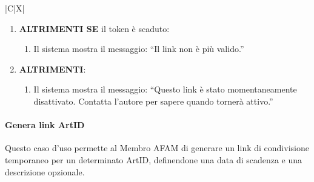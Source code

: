 \begin{tabularx}{\textwidth}{|C|X|}
{\begin{enumerate}
\begin{enumerate}
        \begin{enumerate}
            \item Il sistema mostra il messaggio: ``L'ArtID desiderato non esiste pi\`u.''
        \end{enumerate}
    \end{enumerate}
    \item \textbf{ALTRIMENTI SE} il token \`e scaduto:
        \begin{enumerate}
            \item Il sistema mostra il messaggio: ``Il link non \`e pi\`u valido.''
        \end{enumerate}
    \item \textbf{ALTRIMENTI}:
        \begin{enumerate}
            \item Il sistema mostra il messaggio: ``Questo link \`e stato momentaneamente disattivato. Contatta l'autore per sapere quando torner\`a attivo.''
        \end{enumerate}
\end{enumerate}
}
\hline
\end{tabularx}

\clearpage

\paragraph{Genera link ArtID}
\par{\noindent Questo caso d'uso permette al Membro AFAM di generare un link di condivisione temporaneo per un determinato ArtID, definendone una data di scadenza e una descrizione opzionale.}

